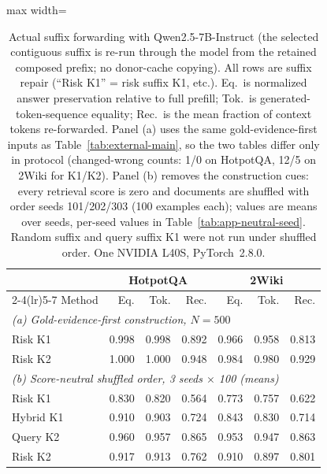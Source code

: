 \begin{table}[t]
\centering
\footnotesize
\setlength{\tabcolsep}{3pt}
\begin{adjustbox}{max width=\linewidth}
\begin{tabular}{lrrrrrr}
\toprule
 & \multicolumn{3}{c}{HotpotQA} & \multicolumn{3}{c}{2Wiki} \\
\cmidrule(lr){2-4}\cmidrule(lr){5-7}
Method & Eq. & Tok. & Rec. & Eq. & Tok. & Rec. \\
\midrule
\multicolumn{7}{l}{\emph{(a) Gold-evidence-first construction, $N=500$}} \\
Risk K1 & 0.998 & 0.998 & 0.892 & 0.966 & 0.958 & 0.813 \\
Risk K2 & 1.000 & 1.000 & 0.948 & 0.984 & 0.980 & 0.929 \\
\midrule
\multicolumn{7}{l}{\emph{(b) Score-neutral shuffled order, 3 seeds $\times$ 100 (means)}} \\
Risk K1 & 0.830 & 0.820 & 0.564 & 0.773 & 0.757 & 0.622 \\
Hybrid K1 & 0.910 & 0.903 & 0.724 & 0.843 & 0.830 & 0.714 \\
Query K2 & 0.960 & 0.957 & 0.865 & 0.953 & 0.947 & 0.863 \\
Risk K2 & 0.917 & 0.913 & 0.762 & 0.910 & 0.897 & 0.801 \\
\bottomrule
\end{tabular}
\end{adjustbox}
\caption{Actual suffix forwarding with Qwen2.5-7B-Instruct (the selected contiguous suffix is re-run through the model from the retained composed prefix; no donor-cache copying). All rows are suffix repair (``Risk K1'' = risk suffix K1, etc.). Eq.\ is normalized answer preservation relative to full prefill; Tok.\ is generated-token-sequence equality; Rec.\ is the mean fraction of context tokens re-forwarded. Panel (a) uses the same gold-evidence-first inputs as Table~\ref{tab:external-main}, so the two tables differ only in protocol (changed-wrong counts: 1/0 on HotpotQA, 12/5 on 2Wiki for K1/K2). Panel (b) removes the construction cues: every retrieval score is zero and documents are shuffled with order seeds 101/202/303 (100 examples each); values are means over seeds, per-seed values in Table~\ref{tab:app-neutral-seed}. Random suffix and query suffix K1 were not run under shuffled order. One NVIDIA L40S, PyTorch~2.8.0.}
\label{tab:actual-forwarding}
\end{table}
